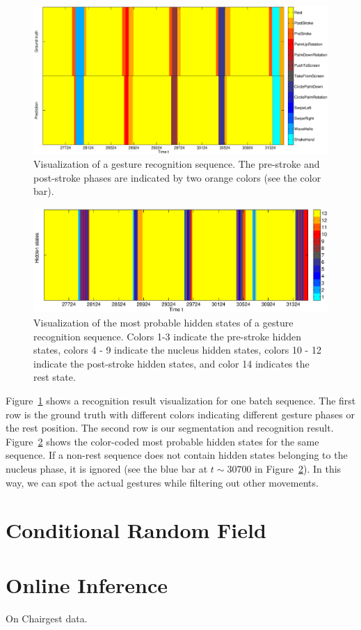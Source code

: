\begin{figure}[tb]
\centering
\includegraphics[trim={4cm 1cm 0cm 0.6cm}, clip,
width=1\columnwidth]{figures/gesture.eps} \caption{Visualization of a gesture
recognition sequence.
The pre-stroke and post-stroke phases are indicated by two orange colors (see the color bar).}
\label{fig:decoding}
\end{figure}

\begin{figure}[tb]
\centering
\includegraphics[trim={3.5cm 0cm 0.5cm 0cm}, clip,
width=1\columnwidth]{figures/hiddenstates.eps} \caption{Visualization of the
most probable hidden states of a gesture recognition sequence.
Colors 1-3 indicate the pre-stroke hidden states, colors 4 - 9
indicate the nucleus hidden states, colors 10 - 12 indicate the post-stroke
hidden states, and color 14 indicates the rest state.}
\label{fig:hiddenstates}
\end{figure}

Figure~\ref{fig:decoding} shows a recognition result visualization for one batch sequence. The first
row is the ground truth with different colors indicating different gesture phases or the rest position. 
The second row is our segmentation and recognition result.
Figure~\ref{fig:hiddenstates} shows the color-coded most probable hidden states
for the same sequence.
If a non-rest sequence does not contain hidden states belonging to the nucleus
phase, it is ignored (see the blue bar at $t\sim 30700$ in Figure~\ref{fig:hiddenstates}).
In this way, we can spot the actual gestures while filtering out other movements.

\section{Conditional Random Field}

\section{Online Inference}
On Chairgest data.